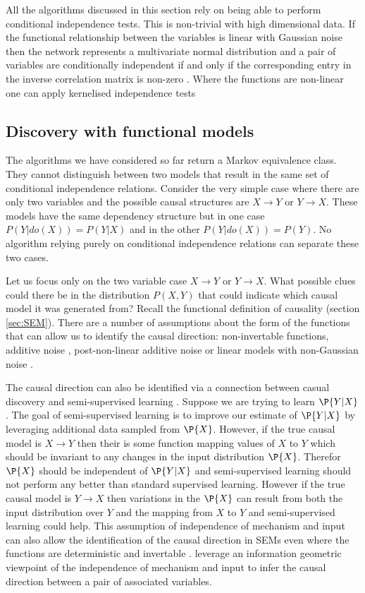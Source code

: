 All the algorithms discussed in this section rely on being able to perform conditional independence tests. This is non-trivial with high dimensional data. If the functional relationship between the variables is linear with Gaussian noise then the network represents a multivariate normal distribution and a pair of variables are conditionally independent if and only if the corresponding entry in the inverse correlation matrix is non-zero \citep{Koller2009}. Where the functions are non-linear one can apply kernelised independence tests \citep{Gretton2008,Zhang2012}


\subsection{Discovery with functional models}
The algorithms we have considered so far return a Markov equivalence class. They cannot distinguish between two models that result in the same set of conditional independence relations. Consider the very simple case where  there are only two variables and the possible causal structures are $X \rightarrow Y$ or $Y \rightarrow X$. These models have the same dependency structure but in one case $P(Y|do(X)) = P(Y|X)$ and in the other $P(Y|do(X)) = P(Y)$. No algorithm relying purely on conditional independence relations can separate these two cases. 

Let us focus only on the two variable case $X \rightarrow Y$ or $Y \rightarrow X$. What possible clues could there be in the distribution $P(X,Y)$ that could indicate which causal model it was generated from? Recall the functional definition of causality (section \ref{sec:SEM}). There are a number of assumptions about the form of the functions that can allow us to identify the causal direction: non-invertable functions, additive noise \citep{Hoyer2009}, post-non-linear additive noise \citep{Zhang2008a} or linear models with non-Gaussian noise \citep{Hoyer2012}.

The causal direction can also be identified via a connection between casual discovery and semi-supervised learning \citep{Janzing2012}. Suppose we are trying to learn $\P{Y|X}$. The goal of semi-supervised learning is to improve our estimate of $\P{Y|X}$ by leveraging additional data sampled from $\P{X}$. However, if the true causal model is $X \rightarrow Y$ then their is some function mapping values of $X$ to $Y$ which should be invariant to any changes in the input distribution $\P{X}$. Therefor $\P{X}$ should be independent of $\P{Y|X}$ and semi-supervised learning should not perform any better than standard supervised learning. However if the true causal model is $Y \rightarrow X$ then variations in the $\P{X}$ can result from both the input distribution over $Y$ and the mapping from $X$ to $Y$ and semi-supervised learning could help. This assumption of independence of mechanism and input can also allow the identification of the causal direction in SEMs even where the functions are deterministic and invertable \citep{Daniusis2010}. \citet{Janzing2012a} leverage an information geometric viewpoint of the independence of mechanism and input to infer the causal direction between a pair of associated variables.  


